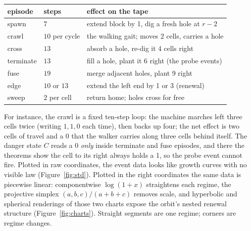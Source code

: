 \documentclass[11pt]{article}
\begin{document}
\begin{center}\small
\begin{tabular}{lll}
episode & steps & effect on the tape \\ \hline
spawn & $7$ & extend block by 1, dig a fresh hole at $r-2$ \\
crawl & $10$ per cycle & the walking gait; moves 2 cells, carries a hole \\
cross & $13$ & absorb a hole, re-dig it 4 cells right \\
terminate & $13$ & fill a hole, plant it 6 right (the probe events) \\
fuse & $19$ & merge adjacent holes, plant 9 right \\
edge & $10$ or $13$ & extend the left end by 1 or 3 (renewal) \\
sweep & $2$ per cell & return home; holes cross for free \\
\end{tabular}
\end{center}

For instance, the crawl is a fixed ten-step loop: the machine marches
left three cells twice (writing $1,1,0$ each time), then backs up four;
the net effect is two cells of travel and a 0 that the walker carries
along three cells behind itself. The danger state $C$ reads a 0
\emph{only} inside terminate and fuse episodes, and there the theorems
show the cell to its right always holds a 1, so the probe event cannot
fire. Plotted in raw coordinates, the event data looks like growth
curves with no visible law (Figure~\ref{fig:std}). Plotted in the
right coordinates the same data is piecewise linear: componentwise
$\log(1{+}x)$ straightens each regime, the projective simplex
$(a,b,c)/(a{+}b{+}c)$ removes scale, and hyperbolic and spherical
renderings of those two charts expose the orbit's nested renewal
structure (Figure~\ref{fig:charts}). Straight segments
are one regime; corners are regime changes.
\end{document}
